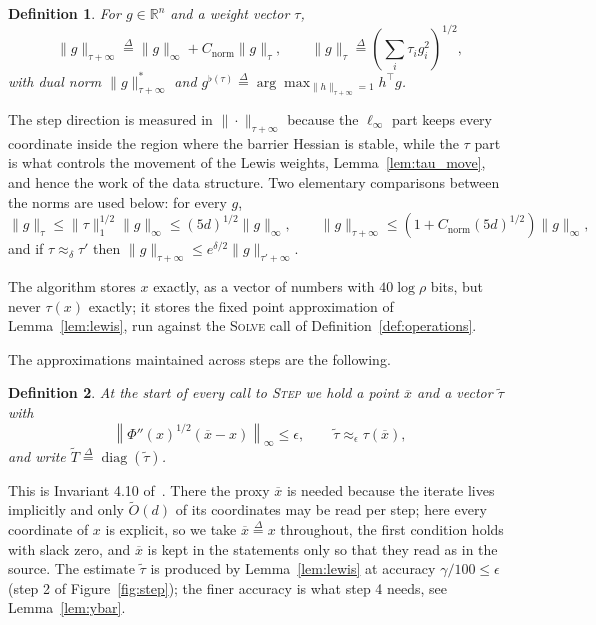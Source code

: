 \documentclass[11pt]{article}
\newtheorem{definition}{Definition}[section]
\newcommand{\R}{\mathbb R}
\newcommand{\diag}{\operatorname{diag}}
\renewcommand{\O}{\widetilde O}
\newcommand{\tautil}{\widetilde{\tau}}
\newcommand{\defeq}{\stackrel{\Delta}{=}}
\newcommand{\Cnorm}{C_{\mathrm{norm}}}
\begin{document}
\begin{definition}
\label{def:taunorm}
For $g \in \R^{n}$ and a weight vector
$\tau$,
\[
\|g\|_{\tau + \infty}
\defeq
\|g\|_{\infty} + \Cnorm \|g\|_{\tau},
\qquad
\|g\|_{\tau} \defeq \left( \sum_i \tau_i g_i^2 \right)^{1/2},
\]
with dual norm $\|g\|^{*}_{\tau + \infty}$ and
$g^{\flat(\tau)} \defeq \arg\max_{\|h\|_{\tau + \infty} = 1} h^\top g$.
\end{definition}

The step direction is measured in $\|\cdot\|_{\tau + \infty}$ because the
$\ell_\infty$ part keeps every coordinate inside the region where the barrier
Hessian is stable, while the $\tau$ part is what controls the movement of the
Lewis weights, Lemma~\ref{lem:tau_move}, and hence the work of the data
structure.
Two elementary comparisons between the norms are used below: for every $g$,
\begin{equation}
\label{eq:norm_compare}
\|g\|_{\tau} \le \|\tau\|_1^{1/2} \|g\|_{\infty} \le (5 d)^{1/2} \|g\|_{\infty},
\qquad
\|g\|_{\tau + \infty} \le \left( 1 + \Cnorm (5 d)^{1/2} \right) \|g\|_{\infty},
\end{equation}
and if $\tau \approx_{\delta} \tau'$ then
$\|g\|_{\tau + \infty} \le e^{\delta / 2} \|g\|_{\tau' + \infty}$.

The algorithm stores $x$ exactly, as a vector of numbers with
$40 \log \rho$ bits, but never
$\tau(x)$ exactly; it stores the fixed point approximation of
Lemma~\ref{lem:lewis}, run against the \textsc{Solve} call of
Definition~\ref{def:operations}.

The approximations maintained across steps are the following.

\begin{definition}
\label{def:invariant}
At the start of every call to \textsc{Step} we hold a point $\overline{x}$ and a
vector $\tautil$ with
\[
\left\| \Phi''(x)^{1/2} (\overline{x} - x) \right\|_{\infty} \le \epsilon,
\qquad
\tautil \approx_{\epsilon} \tau(\overline{x}),
\]
and write $\widetilde{T} \defeq \diag(\tautil)$.
\end{definition}

This is Invariant 4.10 of~\cite{BLLSSSW21}.
There the proxy $\overline{x}$ is needed because the iterate lives implicitly
and only $\O(d)$ of its coordinates may be read per step; here every coordinate
of $x$ is explicit, so we take
$\overline{x} \defeq x$ throughout, the first condition holds with slack zero,
and $\overline{x}$ is kept in the statements only so that they read as in the
source.
The estimate $\tautil$ is produced by Lemma~\ref{lem:lewis} at accuracy
$\gamma / 100 \le \epsilon$ (step 2 of Figure~\ref{fig:step}); the finer
accuracy is what step 4 needs, see Lemma~\ref{lem:ybar}.
\end{document}
